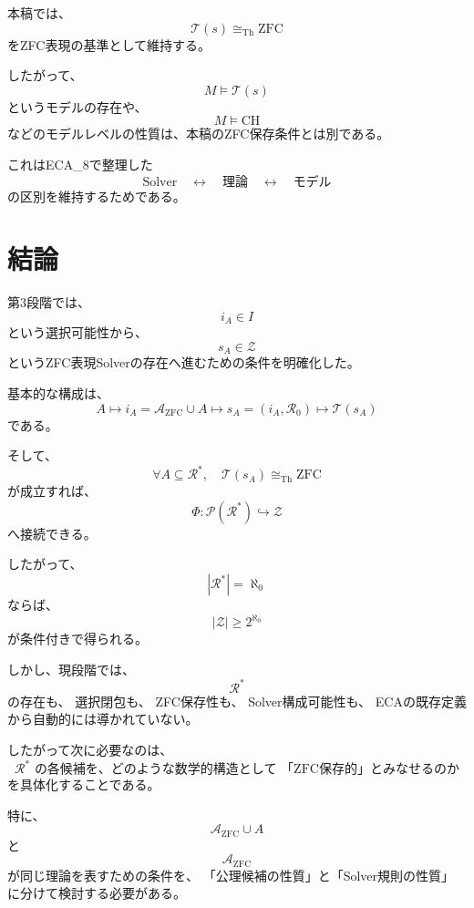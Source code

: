 \documentclass[11pt,a4paper]{article}
\begin{document}
本稿では、
\[
\mathcal T(s)\cong_{\mathrm{Th}}\mathrm{ZFC}
\]
をZFC表現の基準として維持する。

したがって、
\[
M\models\mathcal T(s)
\]
というモデルの存在や、
\[
M\models\mathrm{CH}
\]
などのモデルレベルの性質は、本稿のZFC保存条件とは別である。

これはECA\_8で整理した
\[
\text{Solver}
\quad\longleftrightarrow\quad
\text{理論}
\quad\longleftrightarrow\quad
\text{モデル}
\]
の区別を維持するためである。

\section{結論}

第3段階では、
\[
i_A\in I
\]
という選択可能性から、
\[
s_A\in\mathcal Z
\]
というZFC表現Solverの存在へ進むための条件を明確化した。

基本的な構成は、
\[
A
\longmapsto
i_A
=
\mathcal A_{\mathrm{ZFC}}\cup A
\longmapsto
s_A
=
(i_A,\mathcal R_0)
\longmapsto
\mathcal T(s_A)
\]
である。

そして、
\[
\forall A\subseteq\mathcal R^*,
\quad
\mathcal T(s_A)\cong_{\mathrm{Th}}\mathrm{ZFC}
\]
が成立すれば、
\[
\Phi:\mathcal P(\mathcal R^*)\hookrightarrow\mathcal Z
\]
へ接続できる。

したがって、
\[
|\mathcal R^*|=\aleph_0
\]
ならば、
\[
|\mathcal Z|\geq2^{\aleph_0}
\]
が条件付きで得られる。

しかし、現段階では、
\[
\mathcal R^*
\]
の存在も、
選択閉包も、
ZFC保存性も、
Solver構成可能性も、
ECAの既存定義から自動的には導かれていない。

したがって次に必要なのは、
\[
\boxed{
\mathcal R^*
\text{ の各候補を、どのような数学的構造として
「ZFC保存的」とみなせるのか}
}
\]
を具体化することである。

特に、
\[
\mathcal A_{\mathrm{ZFC}}\cup A
\]
と
\[
\mathcal A_{\mathrm{ZFC}}
\]
が同じ理論を表すための条件を、
「公理候補の性質」と「Solver規則の性質」に分けて検討する必要がある。
\end{document}
